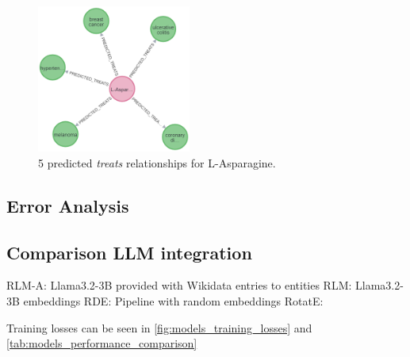 \begin{figure}[ht]
    \centering
    \includegraphics[width=0.45\textwidth]{images/pykeen/predicted treats.png}
    \caption{5 predicted \textit{treats} relationships for L-Asparagine.}
    \label{fig:predicted_treats}
\end{figure}

\subsection*{Error Analysis}


\subsection{Comparison LLM integration}

RLM-A: Llama3.2-3B provided with Wikidata entries to entities
RLM: Llama3.2-3B embeddings
RDE: Pipeline with random embeddings
RotatE:

Training losses can be seen in \ref{fig:models_training_losses} and \ref{tab:models_performance_comparison}

%
%
%


